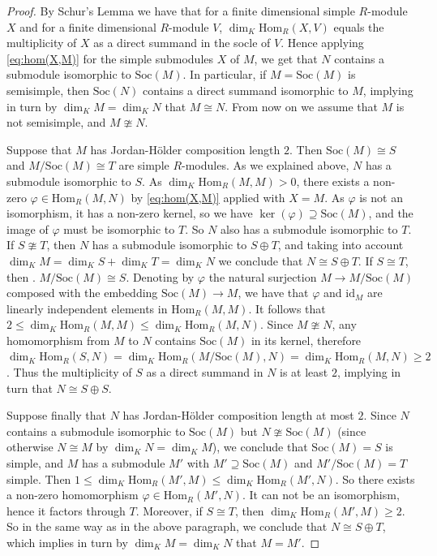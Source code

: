 \documentclass[10pt,a4paper]{amsart}
\newcommand{\field}{K}
\renewcommand{\hom}{\mathrm{Hom}}
\begin{document}
\begin{proof}
By Schur's Lemma we have that for a finite dimensional simple $R$-module $X$ and 
for a finite dimensional $R$-module $V$, $\dim_{\field}\hom_{R}(X, V)$ equals 
the multiplicity of $X$ as a direct summand in the socle of $V$. 
Hence applying \eqref{eq:hom(X,M)} for the simple submodules $X$ of $M$, 
we get that $N$ contains a submodule isomorphic to $\mathrm{Soc}(M)$. 
In particular, if $M=\mathrm{Soc}(M)$ is semisimple, then $\mathrm{Soc}(N)$ 
contains a direct summand isomorphic to $M$, implying in turn 
by $\dim_{\field}M=\dim_{\field}N$  that $M\cong N$. 
From now on we assume that $M$ is not semisimple, 
and $M\ncong N$. 

Suppose that $M$ has Jordan-Hölder composition length $2$. 
Then $\mathrm{Soc}(M)\cong S$ and 
$M/\mathrm{Soc}(M)\cong T$ are simple $R$-modules. 
As we explained above, $N$ has a submodule isomorphic to $S$. 
As $\dim_{\field}\hom_R(M,M)>0$, there exists a non-zero 
$\varphi\in \hom_R(M,N)$ by \eqref{eq:hom(X,M)} applied with $X=M$. 
As $\varphi$ is not an isomorphism,  
it has a non-zero kernel, so we have $\ker(\varphi)\supseteq \mathrm{Soc}(M)$, 
and the image of $\varphi$ must be isomorphic to $T$. So $N$ also has a submodule 
isomorphic to $T$. 
If $S\ncong T$, then $N$ has a submodule isomorphic to $S\oplus T$, 
and taking into account 
$\dim_{\field}M=\dim_{\field}S+\dim_{\field}T=\dim_{\field}N$  
we conclude that $N\cong S\oplus T$. 
If $S\cong T$, then . 
$M/\mathrm{Soc}(M)\cong S$.  
Denoting by $\varphi$ 
the natural surjection $M\to M/\mathrm{Soc}(M)$ composed with the 
embedding $\mathrm{Soc}(M)\to M$, we have that $\varphi$ and 
$\mathrm{id}_M$ are linearly independent elements in 
$\hom_R(M,M)$. It follows that 
$2\le \dim_{\field}\hom_R(M,M)\le 
\dim_{\field}\hom_R(M,N)$. 
Since $M\ncong N$, any homomorphism from $M$ to $N$ contains 
$\mathrm{Soc}(M)$ in its kernel, therefore 
$\dim_{\field}\hom_R(S,N)=\dim_{\field}\hom_R(M/\mathrm{Soc}(M),N)=
\dim_{\field}\hom_R(M,N)\ge 2$. 
Thus the multiplicity of $S$ as a direct summand in $N$ is at least $2$, 
implying in turn that $N\cong S\oplus S$. 

Suppose finally that $N$ has Jordan-Hölder composition length at most $2$. 
Since $N$ contains a submodule isomorphic to 
$\mathrm{Soc}(M)$ but 
$N\ncong \mathrm{Soc}(M)$ 
(since otherwise $N\cong M$ by $\dim_\field N=\dim_\field M$), 
we conclude that $\mathrm{Soc}(M)=S$ is simple, and $M$ has a submodule $M'$ 
with $M'\supseteq \mathrm{Soc}(M)$ and $M'/\mathrm{Soc}(M)=T$ simple. 
Then $1\le \dim_\field\hom_R(M',M)\le \dim_\field\hom_R(M',N)$. 
So there exists a non-zero homomorphism $\varphi\in \hom_R(M',N)$. 
It can not be an isomorphism, hence it factors through $T$. 
Moreover, if $S\cong T$, then $\dim_\field\hom_R(M',M)\ge 2$. 
So in the same way as in the above paragraph, we conclude that $N\cong S\oplus T$, which implies 
in turn by $\dim_\field M=\dim_\field N$ 
that $M=M'$. 
\end{proof}
\end{document}
